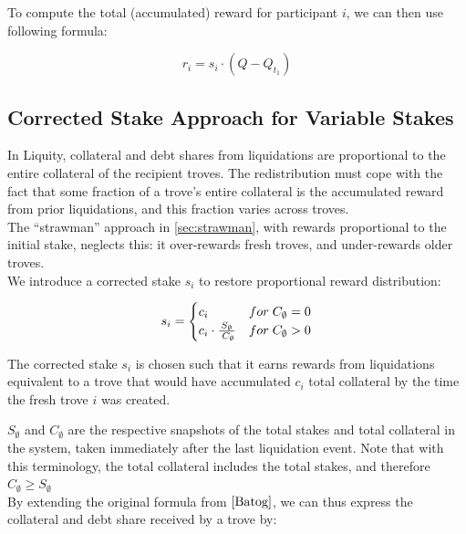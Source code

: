 \documentclass[reqno]{article}
\begin{document}
To compute the total (accumulated) reward for participant $i$, we can then use following formula:

\begin{equation} 
    r_i = s_i \cdot (Q - Q_{t_1})
\end{equation}

\bigskip

\subsection{Corrected Stake Approach for Variable Stakes}
In Liquity, collateral and debt shares from liquidations are proportional to the entire collateral of the recipient troves. The redistribution must cope with the fact that some fraction of a trove's entire collateral is the accumulated reward from prior liquidations, and this fraction varies across troves. \\

The “strawman” approach in \ref{sec:strawman}, with rewards proportional to the initial stake, neglects this: it over-rewards fresh troves, and under-rewards older troves. \\

We introduce a corrected stake $s_i$ to restore proportional reward distribution:

\begin{equation} \label{eq:2}
    s_i=
        \begin{cases} 
            c_i & for \;C_\emptyset = 0\\
            \mathlarger{c_i} \cdot \frac{S_\emptyset} {\;C_\emptyset} & for \;C_\emptyset>0
        \end{cases}
\end{equation}

\bigskip
The corrected stake $s_i$ is chosen such that it earns rewards from liquidations equivalent to a trove that would have accumulated $c_i$ total collateral by the time the fresh trove $i$ was created.
 
$S_\emptyset$ and $C_\emptyset$ are the respective snapshots of the total stakes and total collateral in the system, taken immediately after the last liquidation event. Note that with this terminology, the total collateral includes the total stakes, and therefore $C_\emptyset \ge S_\emptyset$
\\

By extending the original formula from $\cite{Batog}$, we can thus express the collateral and debt share received by a trove by:
\end{document}

